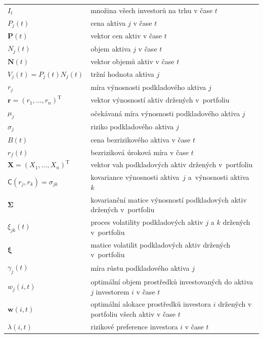 \documentclass[a4paper,12pt]{report}
\theoremstyle{definition} \newtheorem{definice}[veta]{Definice}
\theoremstyle{remark}
\begin{document}
   \begin{tabular}{p{4cm} p{9.3cm}}
   $I_t$ 								& množina všech investorů na trhu v čase $t$\\
   $P_j(t)$                             &   cena aktiva $j$ v čase $t$ \\
   $\boldsymbol{P}(t)$                             &   vektor cen aktiv v čase $t$\\
   $N_j(t)$                             &   objem aktiva $j$ v čase $t$ \\
   $\boldsymbol{N}(t)$     &   vektor objemů aktiv v čase $t$\\
   $V_j(t)=P_j(t)N_j(t)$       &  tržní hodnota aktiva $j$\\
   $r_j$  								& míra výnosnosti podkladového aktiva $j$\\
   $\boldsymbol{r}=(r_1,\dots,r_n)^\mathrm{T}$  		& vektor výnosností aktiv držených v~portfoliu\\
   $\mu_j$ 								& očekávaná míra výnosnosti podkladového aktiva $j$\\
   $\sigma_j$								& riziko podkladového aktiva $j$\\
   $B(t)$ 								& cena bezrizikového aktiva v čase $t$\\
   $r_f(t)$ 								& bezriziková úroková míra v čase $t$\\
   $\boldsymbol{X}=(X_1,\dots,X_n)^\mathrm{T}$		& vektor vah podkladových aktiv držených v~portfoliu\\
   $\mathsf{C}(r_j,r_k)=\sigma_{jk}$				& kovariance výnosnosti aktiva~$j$ a~výnosnosti aktiva~$k$\\
   $\boldsymbol{\Sigma}$						& kovarianční matice výnosností podkladových aktiv držených v~portfoliu\\
   $\xi_{jk}(t)$ 							& proces volatility podkladových aktiv $j$ a $k$ držených v~portfoliu\\
   $\boldsymbol{\xi}$						& matice volatilit podkladových aktiv držených v~portfoliu\\
   $\gamma_j(t)$ 							& míra růstu  podkladového aktiva $j$\\
   $w_{j}(i,t)$ 							& optimální objem prostředků investovaných do aktiva $j$ investorem $i$ v čase $t$\\
   $\boldsymbol{w}(i,t)$					 	& optimální alokace prostředků investora $i$ držených v portfoliu všech aktiv v čase $t$\\
   $\lambda(i,t)$							& rizikové preference investora $i$ v čase $t$ \\  
\end{tabular}\\\\\\
\end{document}
